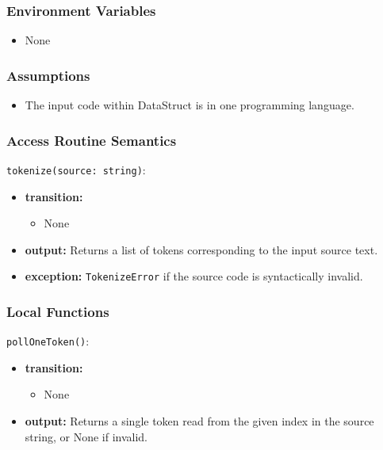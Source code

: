 \documentclass[12pt, titlepage]{article}
\begin{document}
\subsubsection{Environment Variables}

\begin{itemize}
  \item None
\end{itemize}

\subsubsection{Assumptions}

\begin{itemize}
    \item The input code within DataStruct is in one programming language.
\end{itemize}

\subsubsection{Access Routine Semantics}

\noindent \texttt{tokenize(source: string)}:
\begin{itemize}
    \item \textbf{transition:}
    \begin{itemize}
        \item None
    \end{itemize}
    \item \textbf{output:} Returns a list of tokens corresponding to the input source text.
    \item \textbf{exception:} \texttt{TokenizeError} if the source code is syntactically invalid.
\end{itemize}

\subsubsection{Local Functions}

\noindent \texttt{pollOneToken()}:
\begin{itemize}
    \item \textbf{transition:}
    \begin{itemize}
        \item None
    \end{itemize}
    \item \textbf{output:} Returns a single token read from the given index in the source string, or None if invalid.
\end{itemize}
\end{document}
